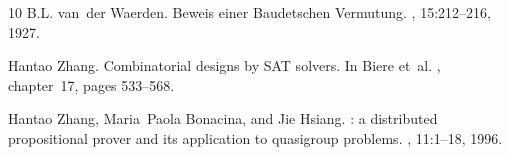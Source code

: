 \documentclass[final,3p,times]{elsarticle}
\theoremstyle{definition}
\begin{document}
\begin{thebibliography}{10}
B.L. van~der Waerden.
\newblock Beweis einer {B}audetschen {V}ermutung.
, 15:212--216, 1927.

Hantao Zhang.
\newblock Combinatorial designs by {SAT} solvers.
\newblock In Biere et~al. \cite{2008HandbuchSAT}, chapter~17, pages 533--568.

Hantao Zhang, Maria~Paola Bonacina, and Jie Hsiang.
: a distributed propositional prover and its application to
  quasigroup problems.
, 11:1--18, 1996.

\end{thebibliography}


\end{document}
